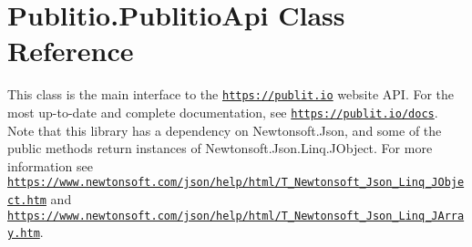 \hypertarget{classPublitio_1_1PublitioApi}{}\section{Publitio.\+Publitio\+Api Class Reference}
\label{classPublitio_1_1PublitioApi}


This class is the main interface to the \href{https://publit.io}{\tt https\+://publit.\+io} website A\+PI. For the most up-\/to-\/date and complete documentation, see \href{https://publit.io/docs}{\tt https\+://publit.\+io/docs}. Note that this library has a dependency on {\ttfamily Newtonsoft.\+Json}, and some of the public methods return instances of {\ttfamily Newtonsoft.\+Json.\+Linq.\+J\+Object}. For more information see \href{https://www.newtonsoft.com/json/help/html/T_Newtonsoft_Json_Linq_JObject.htm}{\tt https\+://www.\+newtonsoft.\+com/json/help/html/\+T\+\_\+\+Newtonsoft\+\_\+\+Json\+\_\+\+Linq\+\_\+\+J\+Object.\+htm} and \href{https://www.newtonsoft.com/json/help/html/T_Newtonsoft_Json_Linq_JArray.htm}{\tt https\+://www.\+newtonsoft.\+com/json/help/html/\+T\+\_\+\+Newtonsoft\+\_\+\+Json\+\_\+\+Linq\+\_\+\+J\+Array.\+htm}. 


